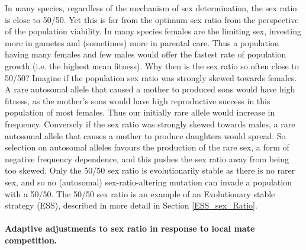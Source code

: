 {In many species, regardless of the mechanism of sex determination, the
sex ratio is close to 50/50. Yet this is far from the optimum sex
ratio from the perspective of the population viability. In many
species females are the limiting sex, investing more in gametes and
(sometimes) more in parental care. Thus a population having many
females and few males would offer the fastest rate of population
growth (i.e. the highest mean fitness). Why then is the sex ratio so
often close to 50/50?
Imagine if the population sex ratio was strongly skewed towards females. A rare autosomal allele that caused a mother to produced sons would have high fitness, as the mother's sons would have high reproductive success in this population of most females. Thus our initially rare allele would increase in frequency.
Conversely if the sex ratio was strongly skewed towards males, a rare autosomal allele that causes a mother to produce daughters would spread.
So selection on autosomal alleles favours the production of the rare
sex, a form of negative frequency dependence, and this pushes the sex ratio away from being too skewed. Only the 50/50 sex ratio is evolutionarily stable as there is no rarer sex, and so no (autosomal) sex-ratio-altering mutation can invade a population with a 50/50.
The 50/50 sex ratio is an example of an Evolutionary stable strategy
(ESS), described in more detail in Section
\ref{ESS_sex_Ratio}.  %



\paragraph{Adaptive adjustments to sex ratio in response to local mate
  competition.}

}
